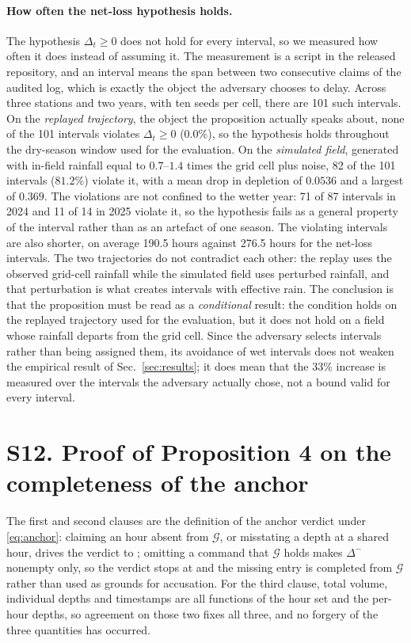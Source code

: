 \paragraph*{How often the net-loss hypothesis holds.}
The hypothesis $\Delta_t\ge0$ does not hold for every interval, so we measured
how often it does instead of assuming it. The measurement is a script in the released
repository, and an interval means the span between two consecutive claims of the audited
log, which is exactly the object the adversary chooses to delay. Across three stations
and two years, with ten seeds per cell, there are 101 such intervals. On the
\emph{replayed trajectory}, the object the proposition actually speaks about, none of the
101 intervals violates $\Delta_t\ge0$ ($0.0\%$), so the hypothesis holds throughout the
dry-season window used for the evaluation. On the \emph{simulated field}, generated with
in-field rainfall equal to $0.7$--$1.4$ times the grid cell plus noise, 82 of the 101
intervals ($81.2\%$) violate it, with a mean drop in depletion of $0.0536$ and a largest
of $0.369$. The violations are not confined to the wetter year: 71 of 87 intervals in
2024 and 11 of 14 in 2025 violate it, so the hypothesis fails as a general property of
the interval rather than as an artefact of one season. The violating intervals are also
shorter, on average 190.5 hours against 276.5 hours for the net-loss intervals. The two
trajectories do not contradict each other: the replay uses the observed grid-cell rainfall
while the simulated field uses perturbed rainfall, and that perturbation is what creates
intervals with effective rain. The conclusion is that the proposition must be read as a
\emph{conditional} result: the condition holds on the replayed trajectory used for the
evaluation, but it does not hold on a field whose rainfall departs from the grid cell.
Since the adversary selects intervals rather than being assigned them, its avoidance of
wet intervals does not weaken the empirical result of Sec.~\ref{sec:results}; it does mean
that the $33\%$ increase is measured over the intervals the adversary actually chose,
not a bound valid for every interval.

\section*{S12. Proof of Proposition 4 on the completeness of the anchor}

The first and second clauses are the definition of the anchor verdict under
\eqref{eq:anchor}: claiming an hour absent from $\mathcal{G}$, or misstating a depth at a
shared hour, drives the verdict to ; omitting a command that $\mathcal{G}$ holds
makes $\Delta^{-}$ nonempty only, so the verdict stops at  and the missing
entry is completed from $\mathcal{G}$ rather than used as grounds for accusation. For the
third clause, total volume, individual depths and timestamps are all functions of the hour
set and the per-hour depths, so agreement on those two fixes all three, and no forgery of
the three quantities has occurred.

